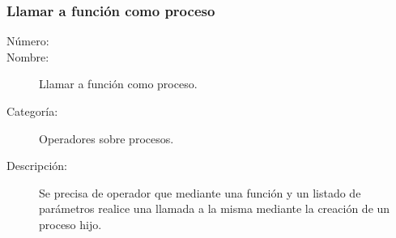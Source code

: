 \subsubsection{Llamar a función como proceso}
\begin{framed}
	\begin{description}
		\item [Número:] \cn
		\item [Nombre:] Llamar a función como proceso.
		\item [Categoría:] Operadores sobre procesos.
		\item [Descripción:] Se precisa de operador que mediante una función y un listado de parámetros realice una llamada 
		a la misma mediante la creación de un proceso hijo.
	\end{description}
\end{framed}
